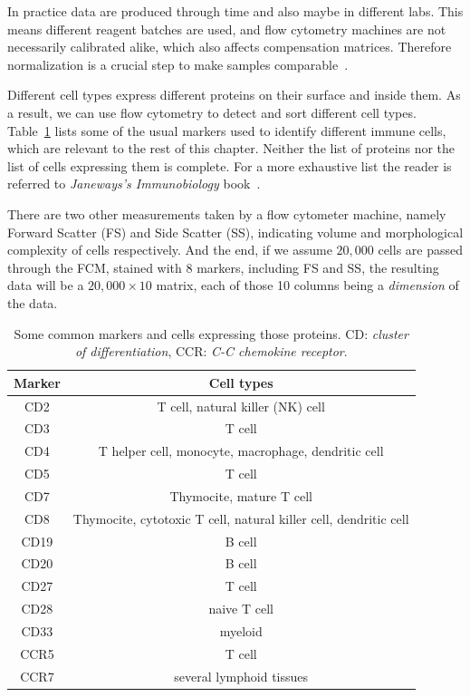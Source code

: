 In practice data are produced through time and also maybe in different labs. This means different reagent batches are used, and flow cytometry machines are not necessarily calibrated alike, which also affects compensation matrices. Therefore normalization is a crucial step to make samples comparable~\cite{fcs-normalization}.

Different cell types express different proteins on their surface and inside them. As a result, we can use flow cytometry to detect and sort different cell types. Table~\ref{tbl:fcs:usual-markers} lists some of the usual markers used to identify different immune cells, which are relevant to the rest of this chapter. Neither the list of proteins nor the list of cells expressing them is complete. For a more exhaustive list the reader is referred to \emph{Janeways's Immunobiology} book~\cite{murphy2016janeway}.

There are two other measurements taken by a flow cytometer machine, namely Forward Scatter (FS) and Side Scatter (SS), indicating volume and morphological complexity of cells respectively. And the end, if we assume $20,000$ cells are passed through the FCM, stained with 8 markers, including FS and SS, the resulting data will be a $20,000 \times 10$ matrix, each of those 10 columns being a \emph{dimension} of the data.

\begin{table}
	\begin{tabular}{c|c}
	Marker & Cell types \\ \hline
	CD2 & T cell, natural killer (NK) cell \\
	CD3 & T cell \\
	CD4 & T helper cell, monocyte, macrophage, dendritic cell \\
	CD5 & T cell \\
	CD7 & Thymocite, mature T cell \\
	CD8 & Thymocite, cytotoxic T cell, natural killer cell, dendritic cell \\
	CD19 & B cell \\
	CD20 & B cell \\
	CD27 & T cell \\
	CD28 & naive T cell \\
	CD33 & myeloid \\
	CCR5 & T cell \\
	CCR7 & several lymphoid tissues
	\end{tabular}
	\caption{Some common markers and cells expressing those proteins. CD: \emph{cluster of differentiation}, CCR: \emph{C-C chemokine receptor}.}
	\label{tbl:fcs:usual-markers}
\end{table}

